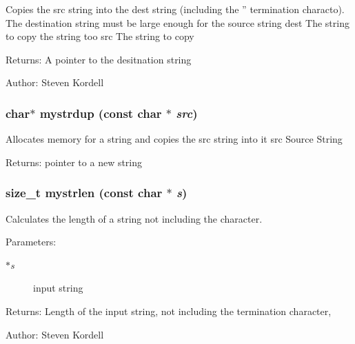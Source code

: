 Copies the src string into the dest string (including the '' termination characto). The destination string must be large enough for the source string  dest The string to copy the string too  src The string to copy \begin{Desc}
\item[Returns:]A pointer to the desitnation string \end{Desc}
\begin{Desc}
\item[Author:]Steven Kordell \end{Desc}
\subsubsection{\setlength{\rightskip}{0pt plus 5cm}char$\ast$ mystrdup (const char $\ast$ {\em src})}\label{mystring_8h_e4d69f24eeedc25d4a7abe09f6656cc2}


Allocates memory for a string and copies the src string into it  src Source String \begin{Desc}
\item[Returns:]pointer to a new string \end{Desc}
\subsubsection{\setlength{\rightskip}{0pt plus 5cm}size\_\-t mystrlen (const char $\ast$ {\em s})}\label{mystring_8h_f1b6719e84687596b7c8c4c9e146bc42}


Calculates the length of a string not including the  character. \begin{Desc}
\item[Parameters:]
\begin{description}
\item[{\em $\ast$s}]input string \end{description}
\end{Desc}
\begin{Desc}
\item[Returns:]Length of the input string, not including the termination character,  \end{Desc}
\begin{Desc}
\item[Author:]Steven Kordell \end{Desc}
